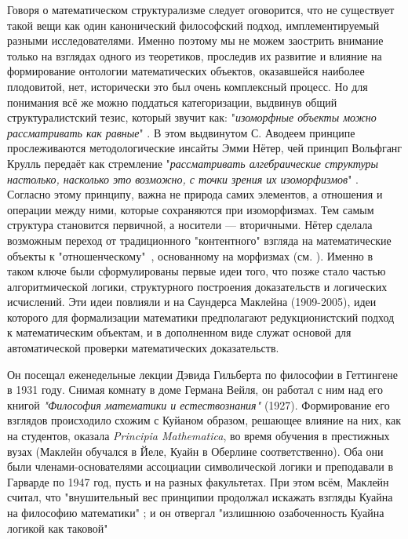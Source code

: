 \documentclass[14pt]{extarticle}
\begin{document}
	Говоря о математическом структурализме следует оговорится, что не существует такой вещи как один канонический философский подход, имплементируемый разными исследователями. Именно поэтому мы не можем заострить внимание только на взглядах одного из теоретиков, проследив их развитие и влияние на формирование онтологии математических объектов, оказавшейся наиболее плодовитой, нет, исторически это был очень комплексный процесс. Но для понимания всё же можно поддаться категоризации, выдвинув общий структуралистский тезис, который звучит как: "\textit{изоморфные объекты можно рассматривать как равные}" \cite{Awodey2014}. В этом выдвинутом С. Аводеем принципе прослеживаются методологические инсайты Эмми Нётер, чей принцип Вольфганг Крулль передаёт как стремление "\textit{рассматривать алгебраические структуры настолько, насколько это возможно, с точки зрения их изоморфизмов}" \cite[4]{Lambek_1970}. Согласно этому принципу, важна не природа самих элементов, а отношения и операции между ними, которые сохраняются при изоморфизмах. Тем самым структура становится первичной, а носители — вторичными. Нётер сделала возможным переход от традиционного "контентного" взгляда на математические объекты к "отношенческому"\ , основанному на морфизмах (см. \cite{Noether}). Именно в таком ключе были сформулированы первые идеи того, что позже стало частью алгоритмической логики, структурного построения доказательств и логических исчислений. Эти идеи повлияли и на Саундерса Маклейна (1909-2005), идеи которого для формализации математики предполагают редукционистский подход к математическим объектам, и в дополненном виде служат основой для автоматической проверки математических доказательств. 
	
	Он посещал еженедельные лекции Дэвида Гильберта по философии в Геттингене в 1931 году.  Снимая комнату в доме Германа Вейля, он работал с ним над его книгой \textit{"Философия математики и естествознания"} (1927). Формирование его взглядов происходило схожим с Куйаном образом, решающее влияние на них, как на студентов, оказала \textit{Principia Mathematica}, во время обучения в престижных вузах (Маклейн обучался в Йеле, Куайн в Оберлине соответственно). Оба они были членами-основателями ассоциации символической логики и преподавали в Гарварде по 1947 год, пусть и на разных факультетах. При этом всём, Маклейн считал, что "внушительный вес принципии продолжал искажать взгляды Куайна на философию математики" \cite[152]{maclane1997}; и он отвергал "излишнюю озабоченность Куайна логикой как таковой" \cite[443]{maclane1986}
	
\end{document}
